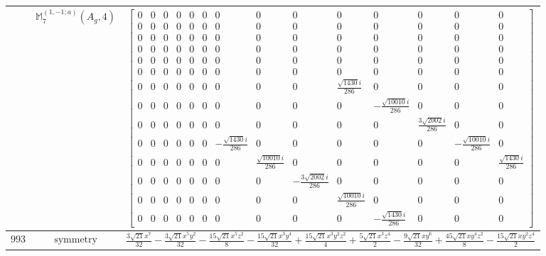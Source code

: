\documentclass[fleqn,8pt,landscape]{jsarticle}
\begin{document}
\begin{longtable}{ccc}
$  $ & $ \mathbb{M}_{7}^{(1,-1;a)}(A_{g},4) $ & $ \begin{bmatrix} 0 & 0 & 0 & 0 & 0 & 0 & 0 & 0 & 0 & 0 & 0 & 0 & 0 & 0 \\ 0 & 0 & 0 & 0 & 0 & 0 & 0 & 0 & 0 & 0 & 0 & 0 & 0 & 0 \\ 0 & 0 & 0 & 0 & 0 & 0 & 0 & 0 & 0 & 0 & 0 & 0 & 0 & 0 \\ 0 & 0 & 0 & 0 & 0 & 0 & 0 & 0 & 0 & 0 & 0 & 0 & 0 & 0 \\ 0 & 0 & 0 & 0 & 0 & 0 & 0 & 0 & 0 & 0 & 0 & 0 & 0 & 0 \\ 0 & 0 & 0 & 0 & 0 & 0 & 0 & 0 & 0 & 0 & 0 & 0 & 0 & 0 \\ 0 & 0 & 0 & 0 & 0 & 0 & 0 & 0 & 0 & \frac{\sqrt{1430} i}{286} & 0 & 0 & 0 & 0 \\ 0 & 0 & 0 & 0 & 0 & 0 & 0 & 0 & 0 & 0 & - \frac{\sqrt{10010} i}{286} & 0 & 0 & 0 \\ 0 & 0 & 0 & 0 & 0 & 0 & 0 & 0 & 0 & 0 & 0 & \frac{3 \sqrt{2002} i}{286} & 0 & 0 \\ 0 & 0 & 0 & 0 & 0 & 0 & - \frac{\sqrt{1430} i}{286} & 0 & 0 & 0 & 0 & 0 & - \frac{\sqrt{10010} i}{286} & 0 \\ 0 & 0 & 0 & 0 & 0 & 0 & 0 & \frac{\sqrt{10010} i}{286} & 0 & 0 & 0 & 0 & 0 & \frac{\sqrt{1430} i}{286} \\ 0 & 0 & 0 & 0 & 0 & 0 & 0 & 0 & - \frac{3 \sqrt{2002} i}{286} & 0 & 0 & 0 & 0 & 0 \\ 0 & 0 & 0 & 0 & 0 & 0 & 0 & 0 & 0 & \frac{\sqrt{10010} i}{286} & 0 & 0 & 0 & 0 \\ 0 & 0 & 0 & 0 & 0 & 0 & 0 & 0 & 0 & 0 & - \frac{\sqrt{1430} i}{286} & 0 & 0 & 0 \end{bmatrix} $ \\ \hline
$ 993 $ & $ \text{symmetry} $ & $ \frac{3 \sqrt{21} x^{7}}{32} - \frac{3 \sqrt{21} x^{5} y^{2}}{32} - \frac{15 \sqrt{21} x^{5} z^{2}}{8} - \frac{15 \sqrt{21} x^{3} y^{4}}{32} + \frac{15 \sqrt{21} x^{3} y^{2} z^{2}}{4} + \frac{5 \sqrt{21} x^{3} z^{4}}{2} - \frac{9 \sqrt{21} x y^{6}}{32} + \frac{45 \sqrt{21} x y^{4} z^{2}}{8} - \frac{15 \sqrt{21} x y^{2} z^{4}}{2} $ \\

\end{longtable}
\end{document}
